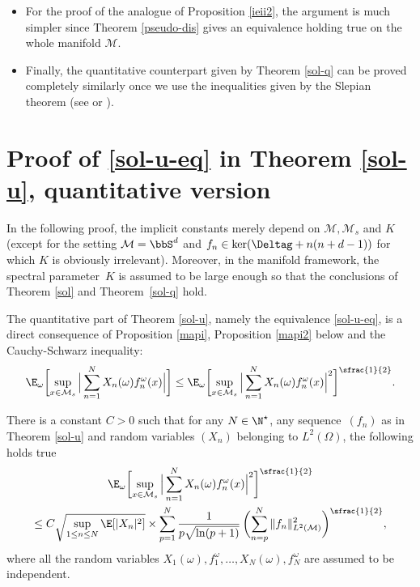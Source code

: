 \begin{itemize}
\item
For the proof of the analogue of Proposition \ref{ieii2}, the argument is much simpler since Theorem \ref{pseudo-dis} gives an equivalence holding true on the whole manifold $\mathcal{M}$.

\item
Finally, the quantitative counterpart given by Theorem \ref{sol-q} can be proved completely similarly once we use the inequalities given by the Slepian theorem (see \cite[Cor.\,3.14]{ledoux} or \cite[p.\,12]{queff2}).
\end{itemize}

\section{Proof of \texorpdfstring{\eqref{sol-u-eq} in Theorem \ref{sol-u}}{Pfth}, quantitative version}\label{sec-marc}

In the following proof, the implicit constants merely depend on $\mathcal{M},\mathcal{M}_s$ and $K$ (except for the setting $\mathcal{M}=\bbS^d$ and $f_n\in \ker(\Deltag+n(n+d-1))$ for which $K$ is obviously irrelevant). Moreover, in the manifold framework, the spectral parameter~$K$ is assumed to be large enough so that the conclusions of Theorem \ref{sol} and Theorem~\ref{sol-q} hold.

The quantitative part of Theorem \ref{sol-u}, namely the equivalence \eqref{sol-u-eq}, is a direct consequence of Proposition \ref{mapi}, Proposition \ref{mapi2} below and the Cauchy-Schwarz inequality:%
\begin{equation}\label{mp-cs}
\E_{\omega}\biggl[\sup_{x\in \mathcal{M}_s}\Big| \sum_{n=1}^N X_n(\omega) f_n^{\omega}(x) \Big| \biggr]\leq \E_{\omega}\biggl[\sup_{x\in \mathcal{M}_s}\Big| \sum_{n=1}^N X_n(\omega) f_n^{\omega}(x) \Big|^2 \biggr]^{\sfrac{1}{2}}.
\end{equation}

\begin{prop}\label{mapi}
There is a constant $C>0$ such that for any $N\in \N^\star$, any sequence~$(f_n)$ as in Theorem \ref{sol-u} and random variables $(X_n)$ belonging to $L^2(\Omega)$, the following holds true
\begin{multline}\label{mapi-b}
\E_{\omega}\biggl[\sup_{x\in \mathcal{M}_s}\Big| \sum_{n=1}^N X_n(\omega) f_n^{\omega}(x) \Big|^2 \biggr]^{\sfrac{1}{2}}\\ \leq C \sqrt{ \sup_{1\leq n\leq N} \E[|X_n|^2]}
\times \sum_{p=1}^N \frac{1}{p\sqrt{\ln(p+1)}}\,\biggl(\sum_{n=p}^{N} \|f_n\|_{L^2(\mathcal{M})}^2 \biggr)^{\sfrac{1}{2}},
\end{multline}
where all the random variables $X_1(\omega),f_1^\omega,\dots,X_N(\omega),f_N^\omega$ are assumed to be independent.
\end{prop}

